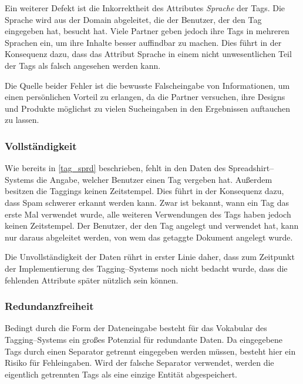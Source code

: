Ein weiterer Defekt ist die Inkorrektheit des Attributes \emph{Sprache} der Tags. Die Sprache wird aus der Domain abgeleitet, die der Benutzer, der den Tag eingegeben hat, besucht hat. Viele Partner geben jedoch ihre Tags in mehreren Sprachen ein, um ihre Inhalte besser auffindbar zu machen. Dies führt in der Konsequenz dazu, dass das Attribut Sprache in einem nicht unwesentlichen Teil der Tags als falsch angesehen werden kann.

Die Quelle beider Fehler ist die bewusste Falscheingabe von Informationen, um einen persönlichen Vorteil zu erlangen, da die Partner versuchen, ihre Designs und Produkte möglichst zu vielen Sucheingaben in den Ergebnissen auftauchen zu lassen.
                                                                                                                                                                                                                                                                                                                                                                                                              
\subsubsection{Vollständigkeit}

Wie bereits in \cref{tag_sprd} beschrieben, fehlt in den Daten des Spreadshirt--Systems die Angabe, welcher Benutzer einen Tag vergeben hat. Außerdem besitzen die Taggings keinen Zeitstempel. Dies führt in der Konsequenz dazu, dass Spam schwerer erkannt werden kann. Zwar ist bekannt, wann ein Tag das erste Mal verwendet wurde, alle weiteren Verwendungen des Tags haben jedoch keinen Zeitstempel. Der Benutzer, der den Tag angelegt und verwendet hat, kann nur daraus abgeleitet werden, von wem das getaggte Dokument angelegt wurde.

Die Unvollständigkeit der Daten rührt in erster Linie daher, dass zum Zeitpunkt der Implementierung des Tagging--Systems noch nicht bedacht wurde, dass die fehlenden Attribute später nützlich sein können.

\subsubsection{Redundanzfreiheit}

Bedingt durch die Form der Dateneingabe besteht für das Vokabular des Tagging--Systems ein großes Potenzial für redundante Daten. Da eingegebene Tags durch einen Separator getrennt eingegeben werden müssen, besteht hier ein Risiko für Fehleingaben. Wird der falsche Separator verwendet, werden die eigentlich getrennten Tags als eine einzige Entität abgespeichert.

